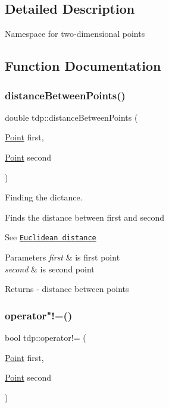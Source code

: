 \subsection{Detailed Description}
Namespace for two-\/dimensional points 

\subsection{Function Documentation}
\mbox{\label{namespacetdp_a05b1894339c9a02c1e9347d3dd6fd07a}} 
\subsubsection{\texorpdfstring{distance\+Between\+Points()}{distanceBetweenPoints()}}
{\footnotesize\ttfamily double tdp\+::distance\+Between\+Points (\begin{DoxyParamCaption}\item[{\mbox{\hyperlink{structtdp_1_1_point}{Point}}}]{first,  }\item[{\mbox{\hyperlink{structtdp_1_1_point}{Point}}}]{second }\end{DoxyParamCaption})}



Finding the dictance. 

Finds the distance between \textquotesingle{}first\textquotesingle{} and \textquotesingle{}second\textquotesingle{}

See \href{https://en.wikipedia.org/wiki/Euclidean_distance}{\tt Euclidean distance}


\begin{DoxyParams}{Parameters}
{\em first} & is first point \\
\hline
{\em second} & is second point \\
\hline
\end{DoxyParams}
\begin{DoxyReturn}{Returns}
-\/ distance between points 
\end{DoxyReturn}
\mbox{\label{namespacetdp_ab1602cb8c233d6ab4a5fa0e12dd219f1}} 
\subsubsection{\texorpdfstring{operator"!=()}{operator!=()}}
{\footnotesize\ttfamily bool tdp\+::operator!= (\begin{DoxyParamCaption}\item[{\mbox{\hyperlink{structtdp_1_1_point}{Point}}}]{first,  }\item[{\mbox{\hyperlink{structtdp_1_1_point}{Point}}}]{second }\end{DoxyParamCaption})}



